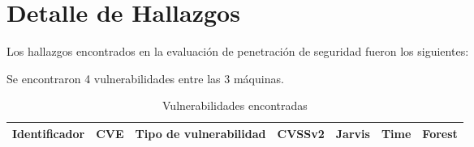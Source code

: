 \documentclass[a4paper]{article}
\begin{document}
    \section{Detalle de Hallazgos}
        \large{Los hallazgos encontrados en la evaluación de penetración de seguridad fueron los siguientes:}
        \par
        \large{Se encontraron 4 vulnerabilidades entre las 3 máquinas.}
        \par
        \begin{table}[H]
            \centering
                \begin{tabular}{|c|c|c|c|c|c|c|}\hline
                    Identificador & CVE & Tipo de vulnerabilidad & CVSSv2 & Jarvis & Time & Forest \\ \hline
                    
                \end{tabular}
                \caption{Vulnerabilidades encontradas}
        \end{table}
        \par
        

    \clearpage
    
    
    
    \clearpage
\end{document}
